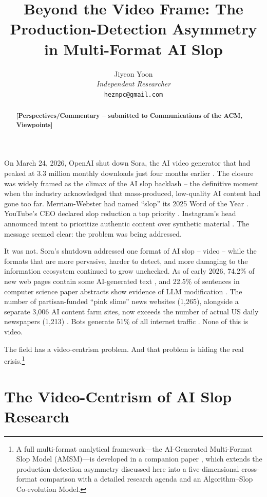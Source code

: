 \documentclass[12pt]{article}
\title{Beyond the Video Frame: The Production-Detection Asymmetry in Multi-Format AI Slop}
\author{%
  Jiyeon Yoon\\
  \textit{Independent Researcher}\\
  \texttt{heznpc@gmail.com}
}
\date{}
\begin{document}
\maketitle

\begin{abstract}
\noindent\textbf{[Perspectives/Commentary -- submitted to Communications of the ACM, Viewpoints]}
\end{abstract}

On March 24, 2026, OpenAI shut down Sora, the AI video generator that had peaked at 3.3 million monthly downloads just four months earlier \cite{npr2026sora}. The closure was widely framed as the climax of the AI slop backlash -- the definitive moment when the industry acknowledged that mass-produced, low-quality AI content had gone too far. Merriam-Webster had named ``slop'' its 2025 Word of the Year \cite{merriamwebster2025}. YouTube's CEO declared slop reduction a top priority \cite{dexerto2026youtube}. Instagram's head announced intent to prioritize authentic content over synthetic material \cite{clippie2026instagram}. The message seemed clear: the problem was being addressed.

It was not. Sora's shutdown addressed one format of AI slop -- video -- while the formats that are more pervasive, harder to detect, and more damaging to the information ecosystem continued to grow unchecked. As of early 2026, 74.2\% of new web pages contain some AI-generated text \cite{ahrefs2025}, and 22.5\% of sentences in computer science paper abstracts show evidence of LLM modification \cite{liang2025nature}. The number of partisan-funded ``pink slime'' news websites (1,265), alongside a separate 3,006 AI content farm sites, now exceeds the number of actual US daily newspapers (1,213) \cite{newsguard2025}. Bots generate 51\% of all internet traffic \cite{imperva2025}. None of this is video.

The field has a video-centrism problem. And that problem is hiding the real crisis.\footnote{A full multi-format analytical framework---the AI-Generated Multi-Format Slop Model (AMSM)---is developed in a companion paper \cite{author2026amsm}, which extends the production-detection asymmetry discussed here into a five-dimensional cross-format comparison with a detailed research agenda and an Algorithm--Slop Co-evolution Model.}

\section{The Video-Centrism of AI Slop Research}
\end{document}
